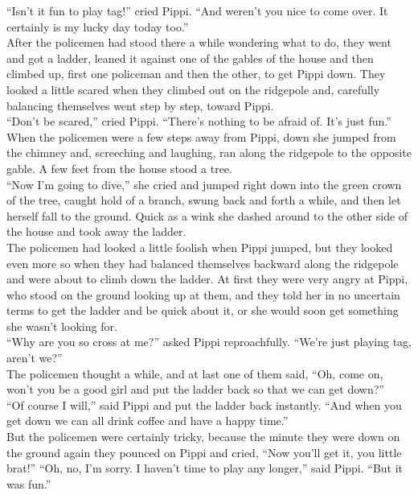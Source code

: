 \documentclass{standard}
\begin{document}
“Isn’t it fun to play tag!” cried Pippi. “And weren’t you nice to come over. It certainly is my lucky day today too.”\\

After the policemen had stood there a while wondering what to do, they went and got a ladder, leaned it against one of the gables of the house and then climbed up, first one policeman and then the other, to get Pippi down. They looked a little scared when they climbed out on the ridgepole and, carefully balancing themselves went step by step, toward Pippi.\\

“Don’t be scared,” cried Pippi. “There’s nothing to be afraid of. It’s just fun.”\\

When the policemen were a few steps away from Pippi, down she jumped from the chimney and, screeching and laughing, ran along the ridgepole to the opposite gable. A few feet from the house stood a tree.\\

“Now I’m going to dive,” she cried and jumped right down into the green crown of the tree, caught hold of a branch, swung back and forth a while, and then let herself fall to the ground. Quick as a wink she dashed around to the other side of the house and took away the ladder.\\

The policemen had looked a little foolish when Pippi jumped, but they looked even more so when they had balanced themselves backward along the ridgepole and were about to climb down the ladder. At first they were very angry at Pippi, who stood on the ground looking up at them, and they told her in no uncertain terms to get the ladder and be quick about it, or she would soon get something she wasn’t looking for.\\

“Why are you so cross at me?” asked Pippi reproachfully. “We’re just playing tag, aren’t we?”\\

The policemen thought a while, and at last one of them said, “Oh, come on, won’t you be a good girl and put the ladder back so that we can get down?”\\

“Of course I will,” said Pippi and put the ladder back instantly. “And when you get down we can all drink coffee and have a happy time.”\\

But the policemen were certainly tricky, because the minute they were down on the ground again they pounced on Pippi and cried, “Now you’ll get it, you little brat!” “Oh, no, I’m sorry. I haven’t time to play any longer,” said Pippi. “But it was fun.”\\
\end{document}
